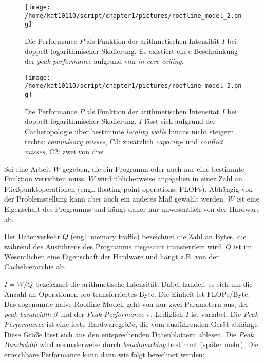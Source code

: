 		\begin{figure}[t]
			\centering
	    	\texttt{[image: /home/kat10110/script/chapter1/pictures/roofline\_model\_2.png]}
    		\caption[Roofline Modell - \textit{in-core ceiling}]{Die Performance $P$ als Funktion der arithmetischen Intensität $I$ bei doppelt-logarithmischer Skalierung. Es existiert ein e Beschränkung der \textit{peak performance} aufgrund von \textit{in-core ceiling}. \autocite{wikiRLM}}
    		\label{1:rl2}
		\end{figure}

		\begin{figure}[b]
			\centering
    		\texttt{[image: /home/kat10110/script/chapter1/pictures/roofline\_model\_3.png]}
	    	\caption[Roofline Modell - \textit{locality walls}]{Die Performance $P$ als Funktion der arithmetischen Intensität $I$ bei doppelt-logarithmischer Skalierung. $I$ lässt sich aufgrund der Cachetopologie über bestimmte \textit{locality walls} hinaus nicht steigern. rechts: \textit{compulsory misses}, C3: zusätzlich \textit{capacity-} und \textit{conflict misses}, C2: zwei von drei \autocite{wikiRLM}}
    		\label{1:rl3}
		\end{figure}
		
		Sei eine \Gls{Arbeit} $W$ gegeben, die ein Programm oder auch nur eine bestimmte Funktion verrichten muss. $W$ wird üblicherweise angegeben in einer Zahl an Fließpunktoperationen (engl. floating point operations, FLOPs). Abhängig von der Problemstellung kann aber auch ein anderes Maß gewählt werden. $W$ ist eine Eigenschaft des Programms und hängt daher nur unwesentlich von der Hardware ab.
		
		Der \Gls{Datenverkehr} $Q$ (engl. memory traffic) bezeichnet die Zahl an Bytes, die während des Ausführens des Programms insgesamt transferriert wird. $Q$ ist im Wesentlichen eine Eigenschaft der Hardware und hängt z.B. von der Cachehierarchie ab.

		$I = W/Q$ bezeichnet die \gls{arithmetische Intensität}. Dabei handelt es sich um die Anzahl an Operationen pro transferriertes Byte. Die Einheit ist FLOPs/Byte.
		Das sogenannte naive Roofline Modell geht von nur zwei Parametern aus, der \textit{peak bandwidth} $\beta$ und der \textit{\Gls{Peak Performance}} $\pi$. Lediglich $I$ ist variabel. Die \textit{\Gls{Peak Performance}} ist eine feste Hardwaregröße, die vom ausführenden Gerät abhängt. Diese Größe lässt sich aus den entsprechenden Datenblättern ablesen. Die \textit{\Gls{Peak Bandwidth}} wird normalerweise durch \textit{benchmarking} bestimmt (später mehr). Die erreichbare \Gls{Performance} kann dann wie folgt berechnet werden:
		
